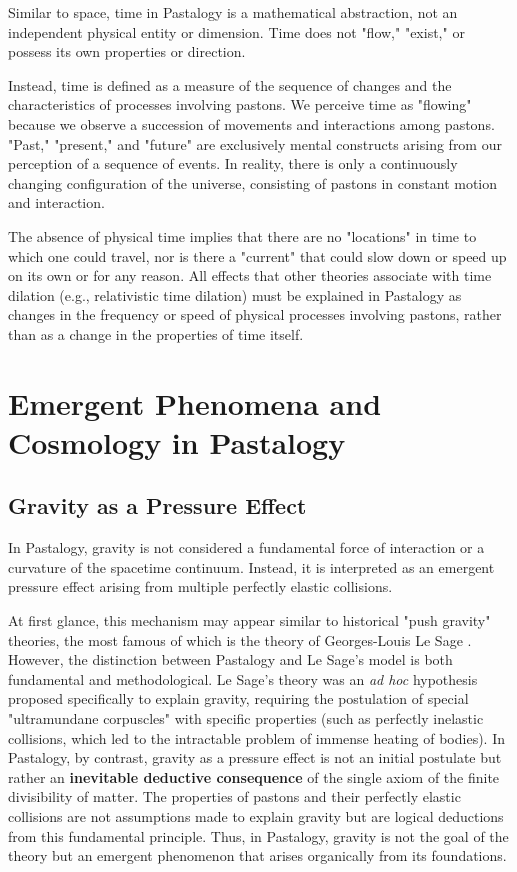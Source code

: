 \documentclass[pdflatex,sn-mathphys-num]{sn-jnl}
\begin{document}
Similar to space, time in Pastalogy is a mathematical abstraction, not an independent physical entity or dimension. Time does not "flow," "exist," or possess its own properties or direction.

Instead, time is defined as a measure of the sequence of changes and the characteristics of processes involving pastons. We perceive time as "flowing" because we observe a succession of movements and interactions among pastons. "Past," "present," and "future" are exclusively mental constructs arising from our perception of a sequence of events. In reality, there is only a continuously changing configuration of the universe, consisting of pastons in constant motion and interaction.

The absence of physical time implies that there are no "locations" in time to which one could travel, nor is there a "current" that could slow down or speed up on its own or for any reason. All effects that other theories associate with time dilation (e.g., relativistic time dilation) must be explained in Pastalogy as changes in the frequency or speed of physical processes involving pastons, rather than as a change in the properties of time itself.

\section{Emergent Phenomena and Cosmology in Pastalogy}\label{sec:emergent-cosmology}

\subsection{Gravity as a Pressure Effect}\label{subsec:gravity-pressure}

In Pastalogy, gravity is not considered a fundamental force of interaction or a curvature of the spacetime continuum. Instead, it is interpreted as an emergent pressure effect arising from multiple perfectly elastic collisions.

At first glance, this mechanism may appear similar to historical "push gravity" theories, the most famous of which is the theory of Georges-Louis Le Sage \cite{lesage-edwards2014}. However, the distinction between Pastalogy and Le Sage's model is both fundamental and methodological. Le Sage's theory was an \textit{ad hoc} hypothesis proposed specifically to explain gravity, requiring the postulation of special "ultramundane corpuscles" with specific properties (such as perfectly inelastic collisions, which led to the intractable problem of immense heating of bodies). In Pastalogy, by contrast, gravity as a pressure effect is not an initial postulate but rather an \textbf{inevitable deductive consequence} of the single axiom of the finite divisibility of matter. The properties of pastons and their perfectly elastic collisions are not assumptions made to explain gravity but are logical deductions from this fundamental principle. Thus, in Pastalogy, gravity is not the goal of the theory but an emergent phenomenon that arises organically from its foundations.
\end{document}
